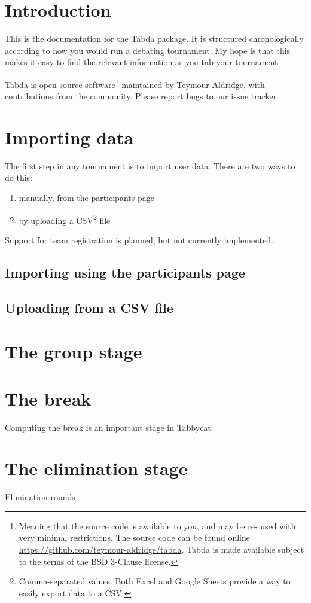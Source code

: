\documentclass{article}
\begin{document}
	
	\section{Introduction}
	
	This is the documentation for the Tabda package. It is structured chronologically
	according to how you would run a debating tournament. My hope is that this makes 
	it easy to find the relevant information as you tab your tournament.
	
	Tabda is open source 
	software\footnote{Meaning that the source code is available to you, and may be re-
	used with very minimal restrictions. The source code can be found online
	\url{https://github.com/teymour-aldridge/tabda}. Tabda is made available subject
	to the terms of the BSD 3-Clause license.} maintained by Teymour Aldridge, with
	contributions from the community. Please report bugs to our issue tracker.
	
	\tableofcontents
	
	\section{Importing data}
	
	The first step in any tournament is to import user data. There are two ways to do
	this:
	
	\begin{enumerate}
		\item manually, from the participants page
		\item by uploading a CSV\footnote{Comma-separated values. Both Excel and
		Google Sheets provide a way to easily export data to a CSV.} file
	\end{enumerate}
	
	Support for team registration is planned, but not currently implemented.
	
	\subsection{Importing using the participants page}
	
	\subsection{Uploading from a CSV file}
	
	
	\section{The group stage}
	
	\section{The break}
	
	Computing the break is an important stage in Tabbycat.
	
	\section{The elimination stage}
	
	Elimination rounds
	
\end{document}
